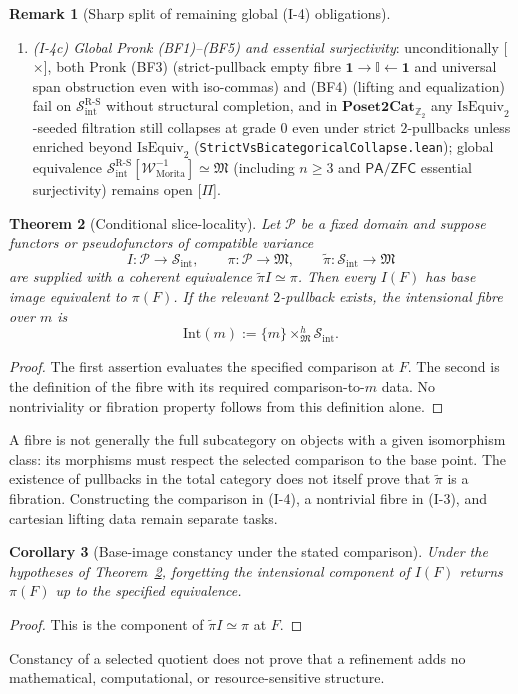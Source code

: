 \documentclass[11pt]{article}
\theoremstyle{plain}
\newtheorem{theorem}{Theorem}[section]
\newtheorem{corollary}[theorem]{Corollary}
\theoremstyle{definition}
\newtheorem{remark}[theorem]{Remark}
\newcommand{\RS}{\mathrm{R\text{-}S}}
\newcommand{\cS}{\mathcal{S}}
\newcommand{\fM}{\mathfrak{M}}
\newcommand{\Sint}{\cS_{\mathrm{int}}}
\newcommand{\PA}{\mathsf{PA}}
\newcommand{\ZFC}{\mathsf{ZFC}}
\newcommand{\tpi}{\widetilde{\pi}}
\begin{document}
\begin{remark}[Sharp split of remaining global (I-4) obligations]
\begin{enumerate}[nosep,label=\textup{(\alph*)}]
\item \emph{\textup{(I-4c)} Global Pronk \textup{(BF1)--(BF5)} and essential surjectivity}: unconditionally \textup{[\textbf{$\times$}]}, both Pronk \textup{(BF3)} (strict-pullback empty fibre $\mathbf{1} \to \mathbb{I} \leftarrow \mathbf{1}$ and universal span obstruction even with iso-commas) and \textup{(BF4)} (lifting and equalization) fail on $\Sint^{\RS}$ without structural completion, and in $\mathbf{Poset2Cat}_{\mathbb{Z}_2}$ any $\mathrm{IsEquiv}_2$-seeded filtration still collapses at grade $0$ even under strict $2$-pullbacks unless enriched beyond $\mathrm{IsEquiv}_2$ (\texttt{StrictVsBicategoricalCollapse.lean}); global equivalence $\Sint^{\RS}[\mathcal{W}_{\mathrm{Morita}}^{-1}] \simeq \fM$ (including $n \ge 3$ and $\PA/\ZFC$ essential surjectivity) remains open \textup{[\textbf{$\Pi$}]}.
\end{enumerate}
\end{remark}

\begin{theorem}[Conditional slice-locality]\label{thm:slice-locality}
Let $\mathcal P$ be a fixed domain and suppose functors or pseudofunctors of compatible variance
\[
 I:\mathcal P\to\Sint,\qquad \pi:\mathcal P\to\fM,
 \qquad\tpi:\Sint\to\fM
\]
are supplied with a coherent equivalence $\tpi I\simeq\pi$. Then every $I(F)$ has base image equivalent to $\pi(F)$. If the relevant $2$-pullback exists, the intensional fibre over $m$ is
\[
 \mathrm{Int}(m):=\{m\}\mathbin{\times}^{h}_{\fM}\Sint.
\]
\end{theorem}
\begin{proof}
The first assertion evaluates the specified comparison at $F$. The second is the definition of the fibre with its required comparison-to-$m$ data. No nontriviality or fibration property follows from this definition alone.
\end{proof}
A fibre is not generally the full subcategory on objects with a given isomorphism class: its morphisms must respect the selected comparison to the base point. The existence of pullbacks in the total category does not itself prove that $\tpi$ is a fibration. Constructing the comparison in (I-4), a nontrivial fibre in (I-3), and cartesian lifting data remain separate tasks.

\begin{corollary}[Base-image constancy under the stated comparison]\label{cor:slice-level}
Under the hypotheses of Theorem~\ref{thm:slice-locality}, forgetting the intensional component of $I(F)$ returns $\pi(F)$ up to the specified equivalence.
\end{corollary}
\begin{proof}
This is the component of $\tpi I\simeq\pi$ at $F$.
\end{proof}
Constancy of a selected quotient does not prove that a refinement adds no mathematical, computational, or resource-sensitive structure.
\end{document}
